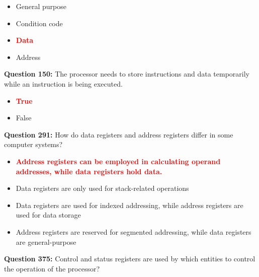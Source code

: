 \documentclass[12pt,a4paper]{article}
\begin{document}
\begin{itemize}
    \item[\textbf{A.}] General purpose
    \item[\textbf{B.}] Condition code
    \item[\textbf{C.}] \textcolor{red}{\textbf{Data}}
    \item[\textbf{D.}] Address
\end{itemize}

\vspace{0.5cm}

\vspace{0.5cm}

\textbf{Question 150:} The processor needs to store instructions and data temporarily while an instruction is being executed.

\begin{itemize}
    \item[\textbf{A.}] \textcolor{red}{\textbf{True}}
    \item[\textbf{B.}] False
\end{itemize}

\vspace{0.5cm}

\vspace{0.5cm}

\textbf{Question 291:} How do data registers and address registers differ in some computer systems?

\begin{itemize}
    \item[\textbf{A.}] \textcolor{red}{\textbf{Address registers can be employed in calculating operand addresses, while data registers hold data.}}
    \item[\textbf{B.}] Data registers are only used for stack-related operations
    \item[\textbf{C.}] Data registers are used for indexed addressing, while address registers are used for data storage
    \item[\textbf{D.}] Address registers are reserved for segmented addressing, while data registers are general-purpose
\end{itemize}

\vspace{0.5cm}

\vspace{0.5cm}

\textbf{Question 375:} Control and status registers are used by which entities to control the operation of the processor?
\end{document}
